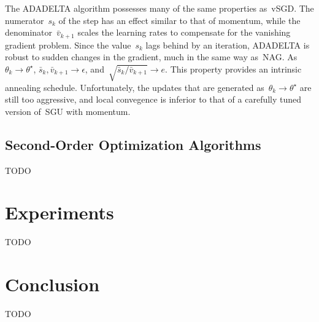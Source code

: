 \documentclass[11pt,a4paper]{article}
\numberwithin{equation}{section}
\begin{document}
The ADADELTA algorithm possesses many of the same properties as~vSGD. The
numerator~$s_k$ of the step has an effect similar to that of momentum, while the
denominator~$\bar{v}_{k + 1}$ scales the learning rates to compensate for the
vanishing gradient problem. Since the value~$s_k$ lags behind by an iteration,
ADADELTA is robust to sudden changes in the gradient, much in the same way
as~NAG. As $\theta_k \to \theta^\star$, $\bar{s}_k, \bar{v}_{k + 1} \to
\epsilon$, and~$\sqrt{\bar{s}_k / \bar{v}_{k + 1}} \to e$. This property
provides an intrinsic annealing schedule. Unfortunately, the updates that are
generated as~$\theta_k \to \theta^\star$ are still too aggressive, and local
convegence is inferior to that of a carefully tuned version of~SGU with
momentum.

\subsection{Second-Order Optimization Algorithms}

TODO

\section{Experiments}

TODO

\section{Conclusion}

TODO




\end{document}
